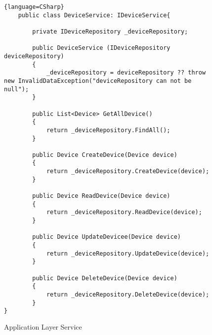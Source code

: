 \begin{figure}[htbp]
    \begin{lstlisting}{language=CSharp}
    public class DeviceService: IDeviceService{

        private IDeviceRepository _deviceRepository;

        public DeviceService (IDeviceRepository deviceRepository)
        {
            _deviceRepository = deviceRepository ?? throw new InvalidDataException("deviceRepository can not be null");
        }

        public List<Device> GetAllDevice()
        {
            return _deviceRepository.FindAll();
        }

        public Device CreateDevice(Device device)
        {
            return _deviceRepository.CreateDevice(device);
        }

        public Device ReadDevice(Device device)
        {
            return _deviceRepository.ReadDevice(device);
        }

        public Device UpdateDevicee(Device device)
        {
            return _deviceRepository.UpdateDevice(device);
        }

        public Device DeleteDevice(Device device)
        {
            return _deviceRepository.DeleteDevice(device);
        }
}
    \end{lstlisting}
    \caption{Application Layer Service}
    \label{fig:applicationLayerService}
\end{figure}